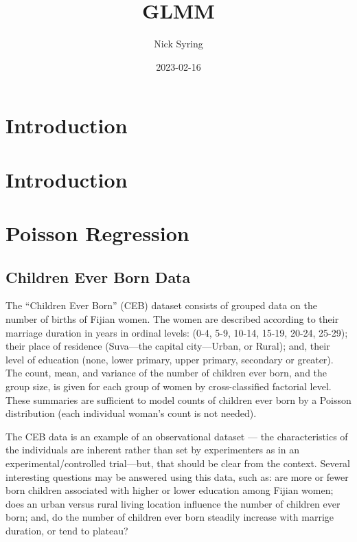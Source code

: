 \documentclass[
]{book}
\title{GLMM}
\author{Nick Syring}
\date{2023-02-16}
\begin{document}
\maketitle

{
\setcounter{tocdepth}{1}
\tableofcontents
}
\hypertarget{introduction}{%
\chapter{Introduction}\label{introduction}}

\hypertarget{intro}{%
\chapter{Introduction}\label{intro}}

\hypertarget{poisson-regression}{%
\chapter{Poisson Regression}\label{poisson-regression}}

\hypertarget{children-ever-born-data}{%
\section{Children Ever Born Data}\label{children-ever-born-data}}

The ``Children Ever Born'' (CEB) dataset consists of grouped data on the number of births of Fijian women. The women are described according to their marriage duration in years in ordinal levels: (0-4, 5-9, 10-14, 15-19, 20-24, 25-29); their place of residence (Suva---the capital city---Urban, or Rural); and, their level of education (none, lower primary, upper primary, secondary or greater). The count, mean, and variance of the number of children ever born, and the group size, is given for each group of women by cross-classified factorial level. These summaries are sufficient to model counts of children ever born by a Poisson distribution (each individual woman's count is not needed).

The CEB data is an example of an observational dataset --- the characteristics of the individuals are inherent rather than set by experimenters as in an experimental/controlled trial---but, that should be clear from the context. Several interesting questions may be answered using this data, such as: are more or fewer born children associated with higher or lower education among Fijian women; does an urban versus rural living location influence the number of children ever born; and, do the number of children ever born steadily increase with marrige duration, or tend to plateau?
\end{document}
